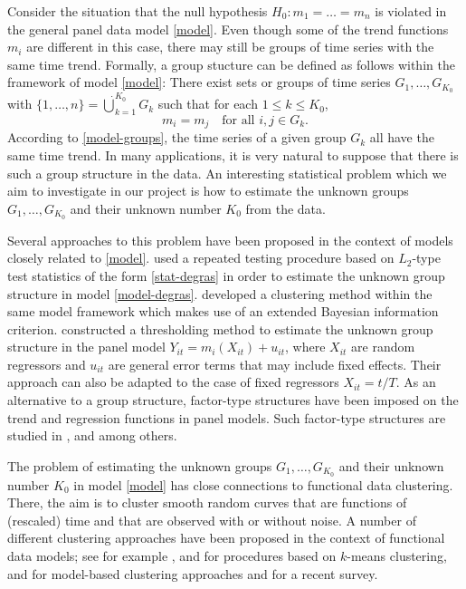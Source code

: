 \noindent Consider the situation that the null hypothesis $H_0: m_1 = \ldots = m_n$ is violated in the general panel data model \eqref{model}. Even though some of the trend functions $m_i$ are different in this case, there may still be groups of time series with the same time trend. Formally, a group stucture can be defined as follows within the framework of model \eqref{model}: There exist sets or groups of time series $G_1,\ldots,G_{K_0}$ with $\{1,\ldots,n\} = \dot\bigcup_{k=1}^{K_0} G_k$ such that for each $1 \le k \le K_0$, 
\begin{equation}\label{model-groups}
m_i = m_j \quad \text{for all } i,j \in G_k. 
\end{equation}
According to \eqref{model-groups}, the time series of a given group $G_k$ all have the same time trend. In many applications, it is very natural to suppose that there is such a group structure in the data. An interesting statistical problem which we aim to investigate in our project is how to estimate the unknown groups $G_1,\ldots,G_{K_0}$ and their unknown number $K_0$ from the data. 


Several approaches to this problem have been proposed in the context of models closely related to \eqref{model}. \cite{DegrasWu2012} used a repeated testing procedure based on $L_2$-type test statistics of the form \eqref{stat-degras} in order to estimate the unknown group structure in model \eqref{model-degras}. \cite{Zhang2013} developed a clustering method within the same model framework which makes use of an extended Bayesian information criterion. \cite{VogtLinton2017} constructed a thresholding method to estimate the unknown group structure in the panel model $Y_{it} = m_i(X_{it}) + u_{it}$, where $X_{it}$ are random regressors and $u_{it}$ are general error terms that may include fixed effects. Their approach can also be adapted to the case of fixed regressors $X_{it} = t/T$.  As an alternative to a group structure, factor-type structures have been imposed on the trend and regression functions in panel models. Such factor-type structures are studied in \cite{Kneip2012}, \cite{LintonVogt2015} and \cite{BonevaLintonVogt2016} among others. 


The problem of estimating the unknown groups $G_1,\ldots,G_{K_0}$ and their unknown number $K_0$ in model \eqref{model} has close connections to functional data clustering. There, the aim is to cluster smooth random curves that are functions of (rescaled) time and that are observed with or without noise. A number of different clustering approaches have been proposed in the context of functional data models; see for example \cite{Abraham2003}, \cite{Tarpey2003} and \cite{Tarpey2007} for procedures based on $k$-means clustering, \cite{James2003} and \cite{Chiou2007} for model-based clustering approaches and \cite{Jacques2014} for a recent survey. 


